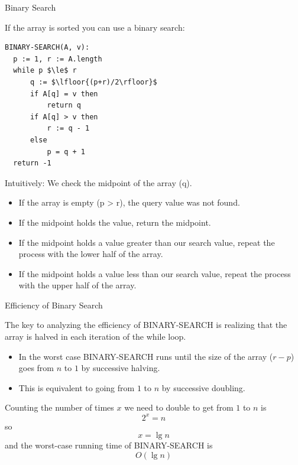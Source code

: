 \documentclass{beamer}
\begin{document}
\begin{frame}[fragile]{Binary Search}

\vspace{-.05in}
If the array is sorted you can use a binary search:
\vspace{-.05in}
\begin{lstlisting}[mathescape]
BINARY-SEARCH(A, v):
  p := 1, r := A.length
  while p $\le$ r
      q := $\lfloor{(p+r)/2\rfloor}$
      if A[q] = v then
          return q
      if A[q] > v then
          r := q - 1
      else
          p = q + 1
  return -1
\end{lstlisting}
\vspace{-.05in}
Intuitively: We check the midpoint of the array (q).
\begin{itemize}
\item If the array is empty (p > r), the query value was not found.
\item If the midpoint holds the value, return the midpoint.
\item If the midpoint holds a value greater than our search value, repeat the process with the lower half of the array.
\item If the midpoint holds a value less than our search value, repeat the process with the upper half of the array.
\end{itemize}

\end{frame}

\begin{frame}[fragile]{Efficiency of Binary Search}

The key to analyzing the efficiency of BINARY-SEARCH is realizing that the array is halved in each iteration of the while loop.
\begin{itemize}
\item In the worst case BINARY-SEARCH runs until the size of the array ($r-p$) goes from $n$ to $1$ by successive halving.
\item This is equivalent to going from $1$ to $n$ by successive doubling.
\end{itemize}
Counting the number of times $x$ we need to double to get from $1$ to $n$ is
\[
2^x = n
\]
so
\[
x = \lg n
\]
and the worst-case running time of BINARY-SEARCH is\\
\[
O(\lg n)
\]

\end{frame}
\end{document}
